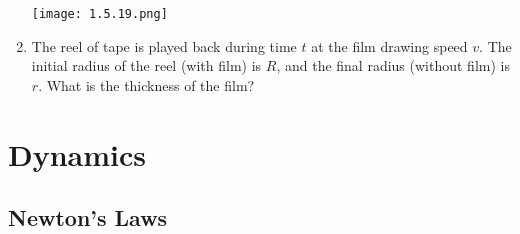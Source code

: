 \documentclass{article}
\begin{document}
\begin{enumerate}[label=1.5.\arabic*]
\begin{center}
    \texttt{[image: 1.5.19.png]}
\end{center}

\item The reel of tape is played back during time $t$ at the film drawing speed $v$. The initial radius of the reel (with film) is $R$, and the final radius (without film) is $r$. What is the thickness of the film?

 
 
 
\end{enumerate}



\section{Dynamics}

\subsection{Newton's Laws}
\end{document}
